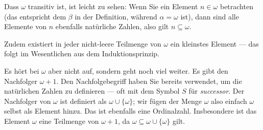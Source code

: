 \begin{spoken-clean}[00:41:28 - 00:42:58]
Dass $\omega$ transitiv ist, ist leicht zu sehen: Wenn Sie ein Element $n \in \omega$ betrachten (das entspricht dem $\beta$ in der Definition, während $\alpha = \omega$ ist), dann sind alle Elemente von $n$ ebenfalls natürliche Zahlen, also gilt $n \subseteq \omega$.

Zudem existiert in jeder nicht-leere Teilmenge von $\omega$ ein kleinstes Element --- das folgt im Wesentlichen aus dem Induktionsprinzip.

Es hört bei $\omega$ aber nicht auf, sondern geht noch viel weiter. Es gibt den Nachfolger $\omega + 1$. Den Nachfolgebegriff haben Sie bereits verwendet, um die natürlichen Zahlen zu definieren --- oft mit dem Symbol $S$ für \emph{successor}. Der Nachfolger von $\omega$ ist definiert als $\omega \cup \{\omega\}$; wir fügen der Menge $\omega$ also einfach $\omega$ selbst als Element hinzu. Das ist ebenfalls eine Ordinalzahl. Insbesondere ist das Element $\omega$ eine Teilmenge von $\omega + 1$, da $\omega \subseteq \omega \cup \{\omega\}$ gilt.
\end{spoken-clean}

\begin{math-stroke}

\end{math-stroke}

